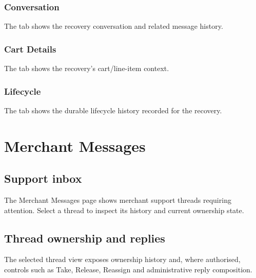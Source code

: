 \subsection{Conversation}
The  tab shows the recovery conversation and related message history.


\subsection{Cart Details}
The  tab shows the recovery's cart/line-item context.


\subsection{Lifecycle}
The  tab shows the durable lifecycle history recorded for the recovery.



\chapter{Merchant Messages}

\section{Support inbox}
The Merchant Messages page shows merchant support threads requiring attention. Select a thread to inspect its history and current ownership state.


\section{Thread ownership and replies}
The selected thread view exposes ownership history and, where authorised, controls such as Take, Release, Reassign and administrative reply composition.


